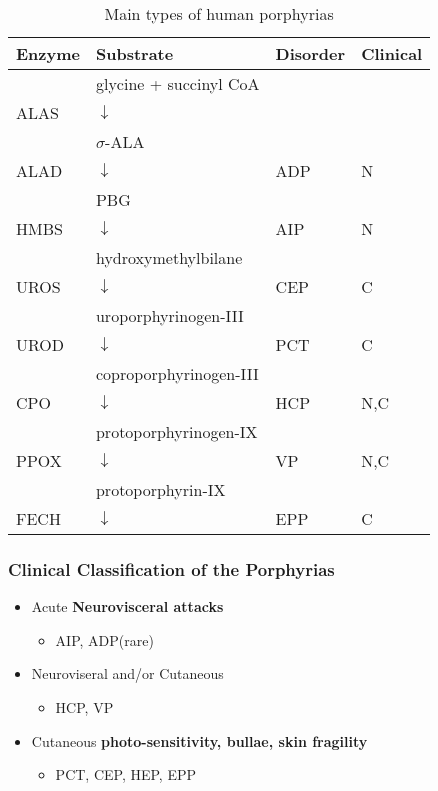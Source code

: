 \documentclass{scrartcl}
\begin{document}
\begin{table}[htbp]
\caption{\label{tab:org302104d}Main types of human porphyrias}
\centering
\begin{tabular}{llll}
Enzyme & Substrate & Disorder & Clinical\\
\hline
 & glycine + succinyl CoA &  & \\
ALAS & \(\downarrow\) &  & \\
 & \(\sigma\)-ALA &  & \\
ALAD & \(\downarrow\) & ADP & N\\
 & PBG &  & \\
HMBS & \(\downarrow\) & AIP & N\\
 & hydroxymethylbilane &  & \\
UROS & \(\downarrow\) & CEP & C\\
 & uroporphyrinogen-III &  & \\
UROD & \(\downarrow\) & PCT & C\\
 & coproporphyrinogen-III &  & \\
CPO & \(\downarrow\) & HCP & N,C\\
 & protoporphyrinogen-IX &  & \\
PPOX & \(\downarrow\) & VP & N,C\\
 & protoporphyrin-IX &  & \\
FECH & \(\downarrow\) & EPP & C\\
\end{tabular}
\end{table}

\subsubsection{Clinical Classification of the Porphyrias}
\label{sec:orgf048bfb}
\begin{itemize}
\item Acute \textbf{Neurovisceral attacks}
\begin{itemize}
\item AIP, ADP(rare)
\end{itemize}

\item Neuroviseral and/or Cutaneous
\begin{itemize}
\item HCP, VP
\end{itemize}

\item Cutaneous \textbf{photo-sensitivity, bullae, skin fragility}
\begin{itemize}
\item PCT, CEP, HEP, EPP
\end{itemize}
\end{itemize}
\end{document}
